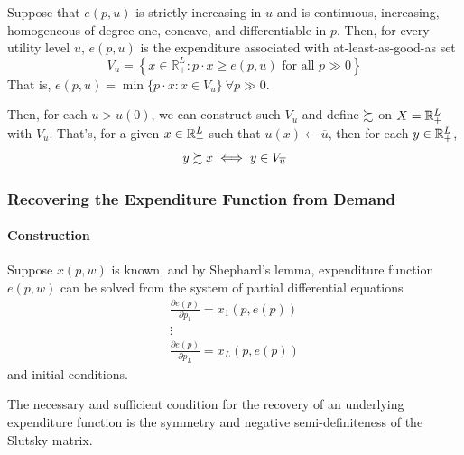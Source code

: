\documentclass{report}
\begin{document}
 			\begin{proposition}[3.H.1]
 				Suppose that $e(p, u)$ is strictly increasing in $u$ and is continuous, increasing, homogeneous of degree one, concave, and differentiable in $p$. Then, for every utility level $u$, $e(p, u)$ is the expenditure associated with at-least-as-good-as set
 				\begin{equation}
 					V_{u}=\left\{x \in \mathbb{R}_{+}^{L} : p \cdot x \geq e(p, u) \text { for all } p \gg 0\right\}
 				\end{equation}
 				That is, $e(p, u) = \min\{p\cdot x: x \in V_u\}\ \forall p \gg 0$.
 			\end{proposition}
 			
 			\par Then, for each $u > u(0)$, we can construct such $V_u$ and define $\succsim$ on $X = \mathbb{R}^L_+$ with $V_u$. That's, for a given $x \in \mathbb{R}^L_+$ such that $u(x) \leftarrow \overline{u}$, then for each $y \in \mathbb{R}^L_+$,
 			\begin{equation}
 				y \succsim x \iff y \in V_{\overline{u}}
 			\end{equation}
 			
 			\subsubsection{Recovering the Expenditure Function from Demand}
 			\paragraph{Construction} Suppose $x(p, w)$ is known, and by Shephard's lemma, expenditure function $e(p, w)$ can be solved from the system of partial differential equations
 			\begin{equation}
 				\begin{array}{l}{\frac{\partial e(p)}{\partial p_{1}}=x_{1}(p, e(p))} \\ {\vdots} \\ {\frac{\partial e(p)}{\partial p_{L}}=x_{L}(p, e(p))}\end{array}
 			\end{equation}
 			and initial conditions.
 			
 			\begin{proposition}
 				The necessary and sufficient condition for the recovery of an underlying expenditure function is the symmetry and negative semi-definiteness of the Slutsky matrix.
 			\end{proposition}
 		
\end{document}
